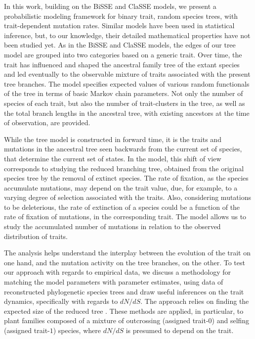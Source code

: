 \documentclass[a4paper,11pt]{article}
\theoremstyle{plain}
\theoremstyle{definition}
\numberwithin{equation}{section}
\begin{document}
In this work, building on the BiSSE and ClaSSE models, we
present a probabilistic modeling framework for binary trait, random
species trees, with trait-dependent mutation rates. Similar models have
been used in statistical inference, but, to our knowledge, their
detailed mathematical properties have not been studied yet. 
As in the BiSSE and ClaSSE models, the edges of our tree model are
grouped into two categories based on a generic trait.  Over time, the
trait has influenced and shaped the ancestral family tree of the
extant species and led eventually to the observable mixture of traits
associated with the present tree branches.  The model specifies
expected values of various random functionals of the tree in terms of
basic Markov chain parameters.  Not only the number of species of each
trait, but also the number of trait-clusters in the tree, as well as
the total branch lengths in the ancestral tree, with existing ancestors
at the time of observation, are provided.  


While the tree model is constructed in forward time, it is the traits
and mutations in the ancestral tree seen backwards from the current
set of species, that determine the current set of states. In the model,
this shift of view corresponds to studying the reduced branching tree,
obtained from the original species tree by the removal of extinct
species.  The rate of fixation, as the species accumulate mutations, may
depend on the trait value, due, for example, to a varying degree of
selection associated with the traits. Also, considering mutations to
be deleterious, the rate of extinction of a species could be
a function of the rate of fixation of mutations, in the corresponding
trait. The model allows us to study the accumulated number of
mutations in relation to the observed distribution of traits.




The analysis helps understand the interplay between the evolution of
the trait on one hand, and the mutation activity on the tree branches,
on the other. To test our approach with regards to empirical data, we
discuss a methodology for matching the model parameters with parameter
estimates, using data of reconstructed phylogenetic species trees and
draw useful inferences on the trait dynamics, specifically with
regards to $dN/dS$. The approach relies on finding the expected size
of the reduced tree \cite{nee_etal}. These methods are applied,
in particular, to plant families composed of a mixture of outcrossing (assigned trait-$0$)
and selfing (assigned trait-$1$) species, where $dN/dS$ is presumed to depend on the trait.
\end{document}

